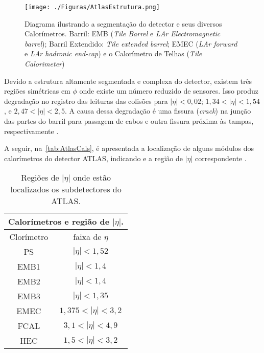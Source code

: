 \begin{figure}[H]
	\begin{center}
		\caption{Diagrama ilustrando a segmentação do detector e seus diversos Calorímetros. Barril: EMB (\textit{Tile Barrel} e \textit{LAr Electromagnetic barrel}); Barril Extendido: \textit{Tile extended barrel}; EMEC (\textit{LAr forward} e \textit{LAr hadronic end-cap}) e o Calorímetro de Telhas (\textit{Tile Calorimeter})}
		\texttt{[image: ./Figuras/AtlasEstrutura.png]}
		\label{fig:segAtlas}
	\end{center}
\end{figure}

Devido a estrutura altamente segmentada e complexa do detector, existem  três regiões simétricas em $\phi$ onde existe um número reduzido de sensores. Isso produz degradação no registro das leituras das colisões para $|\eta|<0,02$; $1,34<|\eta|<1,54$, e $2,47<|\eta|<2,5$. A causa dessa degradação é uma fissura (\textit{crack}) na junção das partes do barril para passagem de cabos e outra fissura próxima às tampas, respectivamente \cite{thesis:werner2018}.


A seguir, na~\autoref{tab:AtlasCals}, é apresentada a localização de alguns módulos dos calorímetros do detector ATLAS, indicando e a região de $|\eta|$ correspondente \cite{atlas2017}.

\begin{table}[H]
	\centering
	\caption{Regiões de $|\eta|$ onde estão localizados os subdetectores do ATLAS.}
	\label{tab:AtlasCals}
	\begin{small}
		\setlength{\extrarowheight}{1pt}       %
		\begin{tabular}{*{2}{c}} \toprule
			\multicolumn{2}{c}{Calorímetros e região de $|\eta|$.}  \\ \midrule
			Clorímetro & faixa de $\eta$ \\ \midrule
			PS         &  $|\eta|<1,52$  \\
			EMB1       &  $|\eta|<1,4$   \\
			EMB2       &  $|\eta|<1,4$   \\
			EMB3       &  $|\eta|<1,35$  \\
			EMEC       &  $1,375 < |\eta|<3,2$  \\
			FCAL       &  $3,1<|\eta|<4,9$ \\
			HEC        &  $1,5<|\eta|<3,2$ \\ \bottomrule
		\end{tabular}%
	\end{small}
\end{table}%

